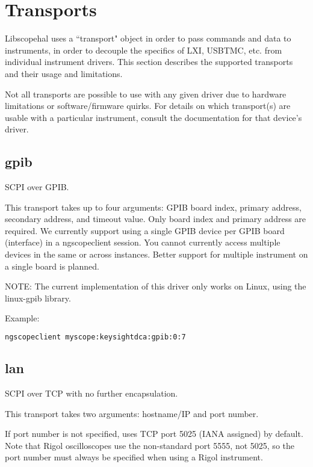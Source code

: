 \chapter{Transports}
\label{sec:transports}

Libscopehal uses a ``transport" object in order to pass commands and data to instruments, in order to decouple the
specifics of LXI, USBTMC, etc. from individual instrument drivers. This section describes the supported transports and
their usage and limitations.

Not all transports are possible to use with any given driver due to hardware limitations or software/firmware quirks.
For details on which transport(s) are usable with a particular instrument, consult the documentation for that device's
driver.

\section{gpib}

SCPI over GPIB.

This transport takes up to four arguments: GPIB board index, primary address, secondary address, and timeout value.
Only board index and primary address are required. We currently support using a single GPIB device per GPIB board 
(interface) in a ngscopeclient session. You cannot currently access multiple devices in the same or across instances.
Better support for multiple instrument on a single board is planned.

NOTE: The current implementation of this driver only works on Linux, using the linux-gpib library.

Example:
\begin{lstlisting}[language=sh, numbers=none]
ngscopeclient myscope:keysightdca:gpib:0:7
\end{lstlisting}

\section{lan}

SCPI over TCP with no further encapsulation.

This transport takes two arguments: hostname/IP and port number.

If port number is not specified, uses TCP port 5025 (IANA assigned) by default. Note that Rigol oscilloscopes use the
non-standard port 5555, not 5025, so the port number must always be specified when using a Rigol instrument.

